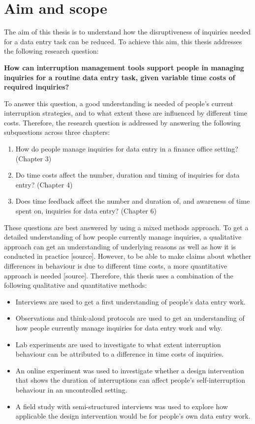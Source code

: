 \section{Aim and scope}
The aim of this thesis is to understand how the disruptiveness of inquiries needed for a data entry task can be reduced. To achieve this aim, this thesis addresses the following research question:

\textbf{How can interruption management tools support people in managing inquiries for a routine data entry task, given variable time costs of required inquiries?}

To answer this question, a good understanding is needed of people's current interruption strategies, and to what extent these are influenced by different time costs. Therefore, the research question is addressed by answering the following subquestions across three chapters:

\begin{enumerate}
\item How do people manage inquiries for data entry in a finance office setting? (Chapter 3)
\item Do time costs affect the number, duration and timing of inquiries for data entry?  (Chapter 4)
\item Does time feedback affect the number and duration of, and awareness of time spent on, inquiries for data entry? (Chapter 6)
\end{enumerate}

These questions are best answered by using a mixed methods approach. To get a detailed understanding of how people currently manage inquiries, a qualitative approach can get an understanding of underlying reasons as well as how it is conducted in practice [source]. However, to be able to make claims about whether differences in behaviour is due to different time costs, a more quantitative approach is needed [source].  
Therefore, this thesis uses a combination of the following qualitative and quantitative methods:

\begin{itemize}
\item Interviews are used to get a first understanding of people's data entry work.
\item Observations and think-aloud protocols are used to get an understanding of how people currently manage inquiries for data entry work and why. 
\item Lab experiments are used to investigate to what extent interruption behaviour can be attributed to a difference in time costs of inquiries. 
\item An online experiment was used to investigate whether a design intervention that shows the duration of interruptions can affect people's self-interruption behaviour in an uncontrolled setting. 
\item A field study with semi-structured interviews was used to explore how applicable the design intervention would be for people's own data entry work. 
\end{itemize}

